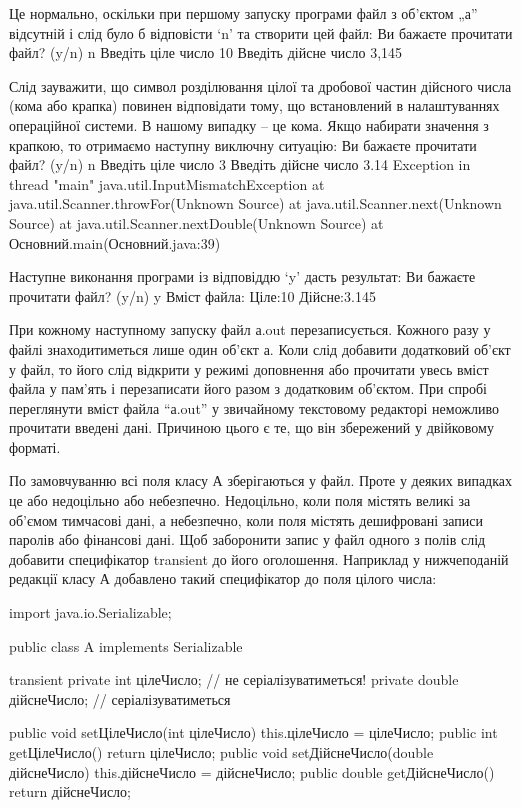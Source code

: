 Це нормально, оскільки при першому запуску програми файл з об’єктом „а” відсутній і слід було б відповісти ‘n’ та створити цей файл:
Ви бажаєте прочитати файл? (y/n) 
n
Введіть ціле число
10
Введіть дійсне число
3,145

Слід зауважити, що символ розділювання цілої та дробової частин дійсного числа (кома або крапка) повинен відповідати тому, що встановлений в налаштуваннях операційної системи. В нашому випадку – це кома. Якщо набирати значення з крапкою, то отримаємо наступну виключну ситуацію:
Ви бажаєте прочитати файл? (y/n) 
n
Введіть ціле число
3
Введіть дійсне число
3.14
Exception in thread "main" java.util.InputMismatchException
	at java.util.Scanner.throwFor(Unknown Source)
	at java.util.Scanner.next(Unknown Source)
	at java.util.Scanner.nextDouble(Unknown Source)
	at Основний.main(Основний.java:39)

Наступне виконання програми із відповіддю ‘y’ дасть результат:
Ви бажаєте прочитати файл? (y/n) 
y
Вміст файла:
Ціле:10
Дійсне:3.145

При кожному наступному запуску файл а.out перезаписується. Кожного разу у файлі знаходитиметься лише один об’єкт а. Коли слід добавити додатковий об’єкт у файл, то його слід відкрити у режимі доповнення або прочитати увесь вміст файла у пам’ять і перезаписати його разом з додатковим об’єктом.
При спробі переглянути вміст файла “а.out” у звичайному текстовому редакторі неможливо прочитати введені дані. Причиною цього є те, що він збережений у двійковому форматі.

По замовчуванню всі поля класу А зберігаються у файл. Проте у деяких випадках це або недоцільно або небезпечно. Недоцільно, коли поля містять великі за об’ємом тимчасові дані, а небезпечно, коли поля містять дешифровані записи паролів або фінансові дані. Щоб заборонити запис у файл одного з полів слід добавити специфікатор transient до його оголошення. Наприклад у нижчеподаній редакції класу А добавлено такий специфікатор до поля цілого числа:

import java.io.Serializable;


public class A implements Serializable{
	transient private int цілеЧисло; // не серіалізуватиметься!
	private double дійснеЧисло; // серіалізуватиметься

	public void setЦілеЧисло(int цілеЧисло) {
		this.цілеЧисло = цілеЧисло;
	}
	public int getЦілеЧисло() {
		return цілеЧисло;
	}
	public void setДійснеЧисло(double дійснеЧисло) {
		this.дійснеЧисло = дійснеЧисло;
	}
	public double getДійснеЧисло() {
		return дійснеЧисло;
	}
}

